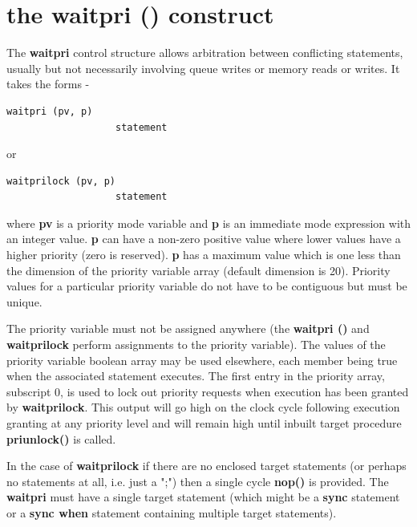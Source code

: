     \section{the waitpri () construct}\label{sec:waitpri}
    
        The {\bf waitpri} control structure allows arbitration between
        conflicting statements, usually but not necessarily involving queue
        writes or memory reads or writes. It takes the forms -
        \begin{lstlisting}[gobble=8, language=threepl]
               waitpri (pv, p)
                   statement
        \end{lstlisting}
        or
        \begin{lstlisting}[gobble=8, language=threepl]
               waitprilock (pv, p)
                   statement
        \end{lstlisting}
        where {\bf pv} is a priority mode variable and {\bf p} is an immediate
        mode expression with an integer value. {\bf p} can have a non-zero
        positive value where lower values have a higher priority (zero is
        reserved). {\bf p} has a maximum value which is one less than the
        dimension of the priority variable array (default dimension is 20).
        Priority values for a particular priority variable do not have to be
        contiguous but must be unique.
        
        The priority variable must not be assigned anywhere (the {\bf waitpri
        ()} and {\bf waitprilock} perform assignments to the priority variable).
        The values of the priority variable boolean array may be used elsewhere,
        each member being true when the associated statement executes. The first
        entry in the priority array, subscript 0, is used to lock out priority
        requests when execution has been granted by {\bf waitprilock}. This
        output will go high on the clock cycle following execution granting at
        any priority level and will remain high until inbuilt target procedure
        {\bf priunlock()} is called.
        
        In the case of {\bf waitprilock} if there are no enclosed target
        statements (or perhaps no statements at all, i.e. just a ";") then a
        single cycle {\bf nop()} is provided. The {\bf waitpri} must have a
        single target statement (which might be a {\bf sync} statement or a {\bf
        sync when} statement containing multiple target statements).
        
